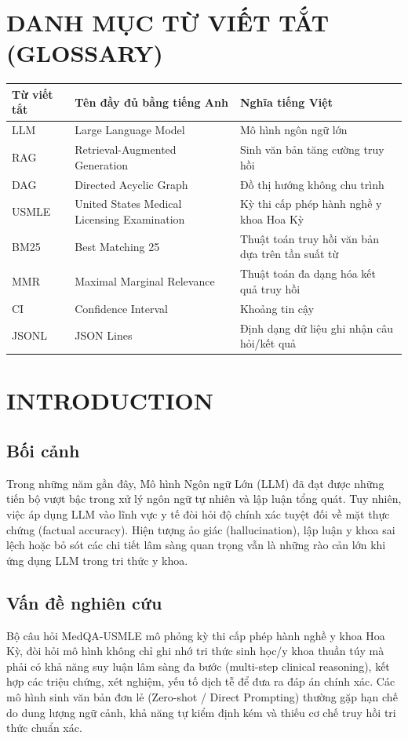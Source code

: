 \section*{DANH MỤC TỪ VIẾT TẮT (GLOSSARY)}
\begin{table}[h!]
\centering
\begin{tabular}{lll}
\toprule
\textbf{Từ viết tắt} & \textbf{Tên đầy đủ bằng tiếng Anh} & \textbf{Nghĩa tiếng Việt} \\
\midrule
LLM & Large Language Model & Mô hình ngôn ngữ lớn \\
RAG & Retrieval-Augmented Generation & Sinh văn bản tăng cường truy hồi \\
DAG & Directed Acyclic Graph & Đồ thị hướng không chu trình \\
USMLE & United States Medical Licensing Examination & Kỳ thi cấp phép hành nghề y khoa Hoa Kỳ \\
BM25 & Best Matching 25 & Thuật toán truy hồi văn bản dựa trên tần suất từ \\
MMR & Maximal Marginal Relevance & Thuật toán đa dạng hóa kết quả truy hồi \\
CI & Confidence Interval & Khoảng tin cậy \\
JSONL & JSON Lines & Định dạng dữ liệu ghi nhận câu hỏi/kết quả \\
\bottomrule
\end{tabular}
\end{table}

\newpage

\section{INTRODUCTION}

\subsection{Bối cảnh}
Trong những năm gần đây, Mô hình Ngôn ngữ Lớn (LLM) đã đạt được những tiến bộ vượt bậc trong xử lý ngôn ngữ tự nhiên và lập luận tổng quát. Tuy nhiên, việc áp dụng LLM vào lĩnh vực y tế đòi hỏi độ chính xác tuyệt đối về mặt thực chứng (factual accuracy). Hiện tượng ảo giác (hallucination), lập luận y khoa sai lệch hoặc bỏ sót các chi tiết lâm sàng quan trọng vẫn là những rào cản lớn khi ứng dụng LLM trong tri thức y khoa.

\subsection{Vấn đề nghiên cứu}
Bộ câu hỏi MedQA-USMLE mô phỏng kỳ thi cấp phép hành nghề y khoa Hoa Kỳ, đòi hỏi mô hình không chỉ ghi nhớ tri thức sinh học/y khoa thuần túy mà phải có khả năng suy luận lâm sàng đa bước (multi-step clinical reasoning), kết hợp các triệu chứng, xét nghiệm, yếu tố dịch tễ để đưa ra đáp án chính xác. Các mô hình sinh văn bản đơn lẻ (Zero-shot / Direct Prompting) thường gặp hạn chế do dung lượng ngữ cảnh, khả năng tự kiểm định kém và thiếu cơ chế truy hồi tri thức chuẩn xác.

